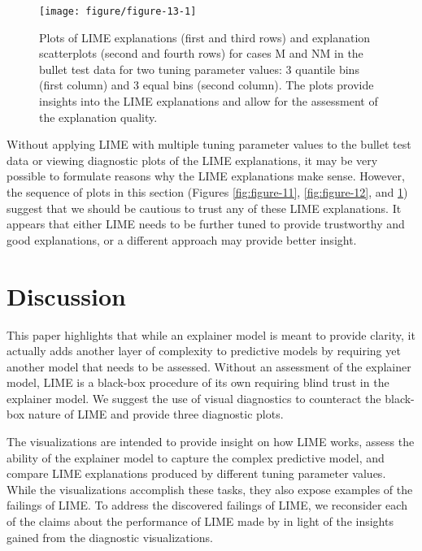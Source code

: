 \documentclass[AMS,STIX2COL]{WileyNJD-v2}\usepackage[]{graphicx}\usepackage[]{color}
\newenvironment{knitrout}{}{} %
\begin{document}
\begin{figure}[!thp]
\begin{knitrout}
\color{fgcolor}

{\centering \texttt{[image: figure/figure-13-1]} 

}



\end{knitrout}
\caption{Plots of LIME explanations (first and third rows) and explanation scatterplots (second and fourth rows) for  cases M and NM in the bullet test data for two tuning parameter values: 3 quantile bins (first column) and 3 equal bins (second column).  The plots provide insights into the LIME explanations and allow for the assessment of the explanation quality.}
\label{fig:figure-13}
\end{figure}

Without applying LIME with multiple tuning parameter values to the bullet test data or viewing diagnostic plots of the LIME explanations, it may be very possible to formulate reasons why the LIME explanations make sense. However, the sequence of plots in this section (Figures \ref{fig:figure-11}, \ref{fig:figure-12}, and \ref{fig:figure-13}) suggest that we should be cautious to trust any of these LIME explanations. It appears that either LIME needs to be further tuned to provide trustworthy and good explanations, or a different approach may provide better insight. 

\section{Discussion} \label{discussion}

This paper highlights that while an explainer model is meant to provide clarity, it actually adds another layer of complexity to predictive models by requiring yet another model that needs to be assessed. Without an assessment of the explainer model, LIME is a black-box procedure of its own requiring blind trust in the explainer model. We suggest the use of visual diagnostics to counteract the black-box nature of LIME and provide three diagnostic plots.

The visualizations are intended to provide insight on how LIME works, assess the ability of the explainer model to capture the complex predictive model, and compare LIME explanations produced by different tuning parameter values. While the visualizations accomplish these tasks, they also expose examples of the failings of LIME. To address the discovered failings of LIME, we reconsider each of the claims about the performance of LIME made by \citet{ribeiro:2016} in light of the insights gained from the diagnostic visualizations.
\end{document}
